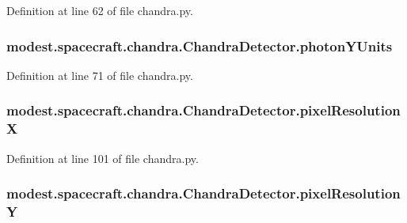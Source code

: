 Definition at line 62 of file chandra.\+py.

\subsubsection[{\texorpdfstring{photon\+Y\+Units}{photonYUnits}}]{\setlength{\rightskip}{0pt plus 5cm}modest.\+spacecraft.\+chandra.\+Chandra\+Detector.\+photon\+Y\+Units}\hypertarget{classmodest_1_1spacecraft_1_1chandra_1_1ChandraDetector_ad2929fae20dc04bef67749c4890a8dce}{}\label{classmodest_1_1spacecraft_1_1chandra_1_1ChandraDetector_ad2929fae20dc04bef67749c4890a8dce}


Definition at line 71 of file chandra.\+py.

\subsubsection[{\texorpdfstring{pixel\+ResolutionX}{pixelResolutionX}}]{\setlength{\rightskip}{0pt plus 5cm}modest.\+spacecraft.\+chandra.\+Chandra\+Detector.\+pixel\+ResolutionX}\hypertarget{classmodest_1_1spacecraft_1_1chandra_1_1ChandraDetector_a04cbb28585d94cebebbbb3fea44dc366}{}\label{classmodest_1_1spacecraft_1_1chandra_1_1ChandraDetector_a04cbb28585d94cebebbbb3fea44dc366}


Definition at line 101 of file chandra.\+py.

\subsubsection[{\texorpdfstring{pixel\+ResolutionY}{pixelResolutionY}}]{\setlength{\rightskip}{0pt plus 5cm}modest.\+spacecraft.\+chandra.\+Chandra\+Detector.\+pixel\+ResolutionY}\hypertarget{classmodest_1_1spacecraft_1_1chandra_1_1ChandraDetector_ae69f57c1ce54292ebeac99f6375e9e0c}{}\label{classmodest_1_1spacecraft_1_1chandra_1_1ChandraDetector_ae69f57c1ce54292ebeac99f6375e9e0c}


